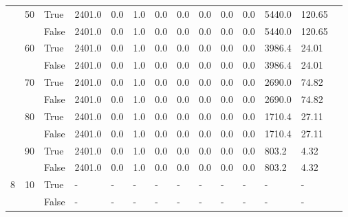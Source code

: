 \begin{appendices}
\begin{landscape}
\begin{small}
\begin{longtable}[c]{@{}lll|ll|ll|ll|ll|lll@{}}
   & 50 & True  & 2401.0          & 0.0            & 1.0           & 0.0           & 0.0           & 0.0           & 0.0           & 0.0           & 5440.0        & 120.65      &  \\
   &    & False & 2401.0          & 0.0            & 1.0           & 0.0           & 0.0           & 0.0           & 0.0           & 0.0           & 5440.0        & 120.65      &  \\
   & 60 & True  & 2401.0          & 0.0            & 1.0           & 0.0           & 0.0           & 0.0           & 0.0           & 0.0           & 3986.4        & 24.01       &  \\
   &    & False & 2401.0          & 0.0            & 1.0           & 0.0           & 0.0           & 0.0           & 0.0           & 0.0           & 3986.4        & 24.01       &  \\
   & 70 & True  & 2401.0          & 0.0            & 1.0           & 0.0           & 0.0           & 0.0           & 0.0           & 0.0           & 2690.0        & 74.82       &  \\
   &    & False & 2401.0          & 0.0            & 1.0           & 0.0           & 0.0           & 0.0           & 0.0           & 0.0           & 2690.0        & 74.82       &  \\
   & 80 & True  & 2401.0          & 0.0            & 1.0           & 0.0           & 0.0           & 0.0           & 0.0           & 0.0           & 1710.4        & 27.11       &  \\
   &    & False & 2401.0          & 0.0            & 1.0           & 0.0           & 0.0           & 0.0           & 0.0           & 0.0           & 1710.4        & 27.11       &  \\
   & 90 & True  & 2401.0          & 0.0            & 1.0           & 0.0           & 0.0           & 0.0           & 0.0           & 0.0           & 803.2         & 4.32        &  \\
   &    & False & 2401.0          & 0.0            & 1.0           & 0.0           & 0.0           & 0.0           & 0.0           & 0.0           & 803.2         & 4.32        &  \\
  \midrule
8  & 10 & True  & -               & -              & -             & -             & -             & -             & -             & -             & -             & -           &  \\
   &    & False & -               & -              & -             & -             & -             & -             & -             & -             & -             & -           &  \\

\end{longtable}
\end{small}
\end{landscape}
\end{appendices}
